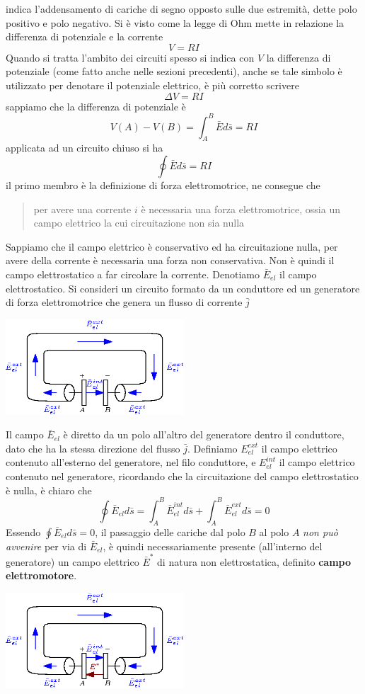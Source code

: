 \documentclass[10pt, letterpaper]{report}
\begin{document}
indica l'addensamento di cariche di segno opposto sulle due estremità, dette polo positivo e polo negativo.\acc 
Si è visto come la legge di Ohm mette in relazione la differenza di potenziale e la corrente 
$$ V=RI$$
Quando si tratta l'ambito dei circuiti spesso si indica con $V$ la differenza di potenziale (come fatto anche nelle sezioni precedenti), anche se tale simbolo è utilizzato per denotare il potenziale elettrico, è più corretto scrivere 
$$ \Delta V = RI$$
sappiamo che la differenza di potenziale è 
$$V(A)-V(B)= \int_A^B\bar E d\bar s=RI $$
applicata ad un circuito chiuso si ha 
$$ \oint \bar Ed\bar s = RI$$
il primo membro è la definizione di forza elettromotrice, ne consegue che \begin{quote}
    per avere una corrente $i$ è necessaria una forza elettromotrice, ossia un campo elettrico la cui circuitazione non sia nulla 
\end{quote} 
Sappiamo che il campo elettrico è conservativo ed ha circuitazione nulla, per avere della corrente è necessaria una forza non conservativa. Non è quindi il campo elettrostatico a far circolare la corrente. Denotiamo $\bar E_{el}$ il campo elettrostatico. Si consideri un circuito formato da un conduttore ed un generatore di forza elettromotrice che genera un flusso di corrente $\bar j$\begin{center}
    \includegraphics[width=0.5\textwidth]{images/circuito2.eps}
\end{center}
Il campo $\bar E_{el}$ è diretto da un polo all'altro del generatore dentro il conduttore, dato che ha la stessa direzione del flusso $\bar j$. Definiamo $E_{el}^{ext}$ il campo elettrico contenuto all'esterno del generatore, nel filo conduttore, e $E_{el}^{int}$ il campo elettrico contenuto nel generatore, ricordando che la circuitazione del campo elettrostatico è nulla, è chiaro che 
$$ \oint\bar  E_{el}d\bar s = \int_A^B \bar E_{el}^{int}d\bar s + \int_A^B \bar E_{el}^{ext}d\bar s=0$$
Essendo $\oint \bar E_{el}d\bar s=0$, il passaggio delle cariche dal polo $B$ al polo $A$ \textit{non può avvenire} per via di $\bar E_{el}$, è quindi necessariamente presente (all'interno del generatore) un campo elettrico $\bar E^*$ di natura non elettrostatica, definito \textbf{campo elettromotore}.\begin{center}
    \includegraphics[width=0.5\textwidth]{images/circuito3.eps}
\end{center}
\end{document}

